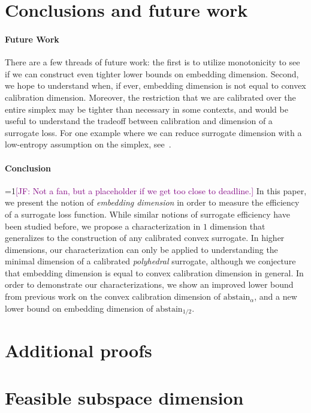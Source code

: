 \documentclass[anon]{colt2020} %
\newcommand{\Comments}{1}
\newcommand{\mynote}[2]{\ifnum\Comments=1\textcolor{#1}{#2}\fi}
\newcommand{\jessie}[1]{\mynote{purple}{[JF: #1]}}
\newcommand{\abstain}[1]{\mathrm{abstain}_{#1}}
\begin{document}
\section{Conclusions and future work}
\paragraph{Future Work}
There are a few threads of future work: the first is to utilize monotonicity to see if we can construct even tighter lower bounds on embedding dimension.
Second, we hope to understand when, if ever, embedding dimension is not equal to convex calibration dimension.
Moreover, the restriction that we are calibrated over the entire simplex may be tighter than necessary in some contexts, and would be useful to understand the tradeoff between calibration and dimension of a surrogate loss.
For one example where we can reduce surrogate dimension with a low-entropy assumption on the simplex, see~\cite[Example 6]{agarwal2015consistent}.

\paragraph{Conclusion}
\jessie{Not a fan, but a placeholder if we get too close to deadline.}
In this paper, we present the notion of \emph{embedding dimension} in order to measure the efficiency of a surrogate loss function.
While similar notions of surrogate efficiency have been studied before, we propose a characterization in $1$ dimension that generalizes to the construction of any calibrated convex surrogate.
In higher dimensions, our characterization can only be applied to understanding the minimal dimension of a calibrated \emph{polyhedral} surrogate, although we conjecture that embedding dimension is equal to convex calibration dimension in general.
In order to demonstrate our characterizations, we show an improved lower bound from previous work on the convex calibration dimension of $\abstain{\alpha}$, and a new lower bound on embedding dimension of $\abstain{1/2}$.

\newpage



\newpage
\appendix

\section{Additional proofs}


\section{Feasible subspace dimension}
\end{document}
